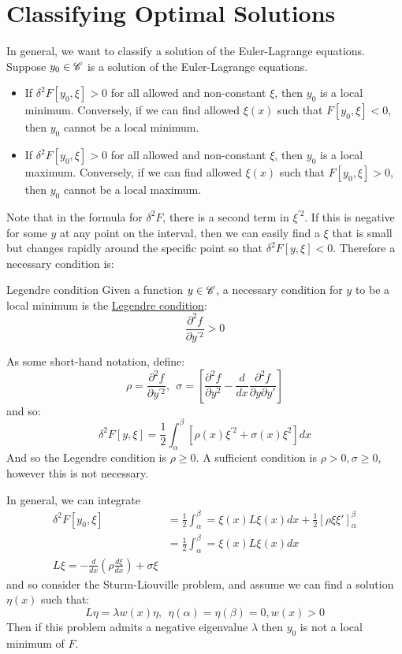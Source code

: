 \documentclass[../Main.tex]{subfiles}
\begin{document}
\section{Classifying Optimal Solutions}
In general, we want to classify a solution of the Euler-Lagrange equations. Suppose $y_0 \in \mathscr{C}$ is a solution of the Euler-Lagrange equations.
\begin{itemize}
    \item If $\delta^2 F[y_0, \xi] > 0$ for all allowed and non-constant $\xi$, then $y_0$ is a local minimum. Conversely, if we can find allowed $\xi(x)$ such that $F[y_0, \xi] < 0$, then $y_0$ cannot be a local minimum.
    \item If $\delta^2 F[y_0, \xi] > 0$ for all allowed and non-constant $\xi$, then $y_0$ is a local maximum. Conversely, if we can find allowed $\xi(x)$ such that $F[y_0, \xi] > 0$, then $y_0$ cannot be a local maximum.
\end{itemize}
Note that in the formula for $\delta^2 F$, there is a second term in $\xi^{\prime 2}$. If this is negative for some $y$ at any point on the interval, then we can easily find a $\xi$ that is small but changes rapidly around the specific point so that $\delta^2 F[y, \xi] < 0$. Therefore a necessary condition is:
\begin{definition}{Legendre condition}
    Given a function $y \in \mathscr{C}$, a necessary condition for $y$ to be a local minimum is the \underline{Legendre condition}:
    \begin{equation*}
        \frac{\partial^2 f}{\partial y^{\prime 2}} > 0
    \end{equation*}
\end{definition}
As some short-hand notation, define:
\begin{equation*}
    \rho = \frac{\partial^2 f}{\partial y^{\prime 2}},~~\sigma = \left[\frac{\partial^2 f}{\partial y^2} - \frac{d}{dx} \frac{\partial^2f}{\partial y \partial y'}\right]
\end{equation*}
and so:
\begin{equation*}
    \delta^2 F[y, \xi] = \frac{1}{2} \int_\alpha^\beta \left[\rho(x) \xi^{\prime 2} + \sigma(x) \xi^2\right]dx
\end{equation*}
And so the Legendre condition is $\rho \geq 0$. A sufficient condition is $\rho > 0, \sigma \geq 0$, however this is not necessary.

In general, we can integrate %
\begin{align*}
    \delta^2 F[y_0, \xi] &= \frac{1}{2} \int_\alpha^\beta = \xi(x) L\xi(x) dx + \frac{1}{2} \left[\rho \xi \xi'\right]_\alpha^\beta \\
    &= \frac{1}{2} \int_\alpha^\beta = \xi(x) L\xi(x) dx \\
    L\xi = -\frac{d}{dx} \left(\rho \frac{d\xi}{dx}\right) + \sigma \xi
\end{align*}
and so consider the Sturm-Liouville problem, and assume we can find a solution $\eta(x)$ such that:
\begin{equation*}
    L\eta = \lambda w(x) \eta,~~\eta(\alpha) = \eta(\beta) = 0, w(x) > 0
\end{equation*}
Then if this problem admits a negative eigenvalue $\lambda$ then $y_0$ is not a local minimum of $F$.
\end{document}
